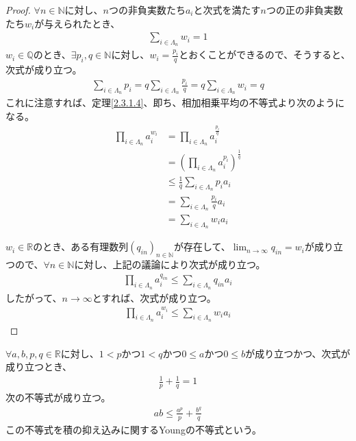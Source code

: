 \documentclass[dvipdfmx]{jsarticle}
\begin{document}
\begin{proof}
$\forall n \in \mathbb{N}$に対し、$n$つの非負実数たち$a_{i}$と次式を満たす$n$つの正の非負実数たち$w_{i}$が与えられたとき、
\begin{align*}
\sum_{i \in \varLambda_{n}} w_{i} = 1
\end{align*}
$w_{i} \in \mathbb{Q}$のとき、$\exists p_{i},q \in \mathbb{N}$に対し、$w_{i} = \frac{p_{i}}{q}$とおくことができるので、そうすると、次式が成り立つ。
\begin{align*}
\sum_{i \in \varLambda_{n}} p_{i} = q\sum_{i \in \varLambda_{n}} \frac{p_{i}}{q} = q\sum_{i \in \varLambda_{n}} w_{i} = q
\end{align*}
これに注意すれば、定理\ref{2.3.1.4}、即ち、相加相乗平均の不等式より次のようになる。
\begin{align*}
\prod_{i \in \varLambda_{n}} a_{i}^{w_{i}} &= \prod_{i \in \varLambda_{n}} a_{i}^{\frac{p_{i}}{q}}\\
&= \left( \prod_{i \in \varLambda_{n}} a_{i}^{p_{i}} \right)^{\frac{1}{q}}\\
&\leq \frac{1}{q}\sum_{i \in \varLambda_{n}} {p_{i}a_{i}}\\
&= \sum_{i \in \varLambda_{n}} {\frac{p_{i}}{q}a_{i}}\\
&= \sum_{i \in \varLambda_{n}} {w_{i}a_{i}}
\end{align*}\par
$w_{i} \in \mathbb{R}$のとき、ある有理数列$\left( q_{in} \right)_{n \in \mathbb{N}}$が存在して、$\lim_{n \rightarrow \infty}q_{in} = w_{i}$が成り立つので、$\forall n \in \mathbb{N}$に対し、上記の議論により次式が成り立つ。
\begin{align*}
\prod_{i \in \varLambda_{n}} a_{i}^{q_{in}} \leq \sum_{i \in \varLambda_{n}} {q_{in}a_{i}}
\end{align*}
したがって、$n \rightarrow \infty$とすれば、次式が成り立つ。
\begin{align*}
\prod_{i \in \varLambda_{n}} a_{i}^{w_{i}} \leq \sum_{i \in \varLambda_{n}} {w_{i}a_{i}}
\end{align*}
\end{proof}
\begin{thm}[積の抑え込みに関するYoungの不等式]\label{2.3.1.6}
$\forall a,b,p,q \in \mathbb{R}$に対し、$1 < p$かつ$1 < q$かつ$0 \leq a$かつ$0 \leq b$が成り立つかつ、次式が成り立つとき、
\begin{align*}
\frac{1}{p} + \frac{1}{q} = 1
\end{align*}
次の不等式が成り立つ。
\begin{align*}
ab \leq \frac{a^{p}}{p} + \frac{b^{q}}{q}
\end{align*}
この不等式を積の抑え込みに関するYoungの不等式という。
\end{thm}
\end{document}

